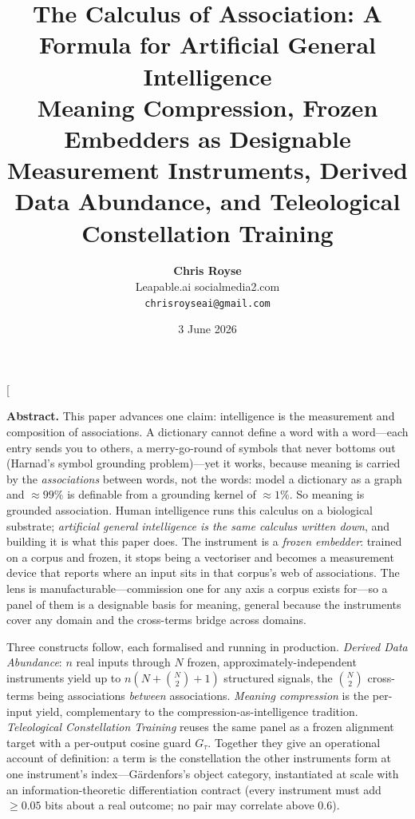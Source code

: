 \documentclass[10pt,twocolumn]{article}
\title{\vspace{-2.2em}\bfseries The Calculus of Association: A Formula for
Artificial General Intelligence\\[0.25em]
\normalsize\mdseries Meaning Compression, Frozen Embedders as Designable
Measurement Instruments, Derived Data Abundance, and Teleological Constellation
Training}
\author{\textbf{Chris Royse}\\[0.2em]
Leapable.ai \textperiodcentered{} socialmedia2.com\\
\texttt{chrisroyseai@gmail.com}}
\date{3 June 2026}
\begin{document}
\twocolumn[
\begin{@twocolumnfalse}
\maketitle
\vspace{-1.0em}
\begin{center}
\begin{minipage}{0.93\textwidth}
\small

\noindent\textbf{Abstract.}
This paper advances one claim: intelligence is the measurement and composition of
associations. A dictionary cannot define a word with a word---each entry sends you
to others, a merry-go-round of symbols that never bottoms out (Harnad's symbol
grounding problem)---yet it works, because meaning is carried by the
\emph{associations} between words, not the words: model a dictionary as a graph and
$\approx 99\%$ is definable from a grounding kernel of $\approx 1\%$. So meaning is
grounded association. Human intelligence runs this calculus on a biological
substrate; \emph{artificial general intelligence is the same calculus written
down}, and building it is what this paper does. The instrument is a \emph{frozen
embedder}: trained on a corpus and frozen, it stops being a vectoriser and becomes
a measurement device that reports where an input sits in that corpus's web of
associations. The lens is manufacturable---commission one for any axis a corpus
exists for---so a panel of them is a designable basis for meaning, general because
the instruments cover any domain and the cross-terms bridge across domains.

Three constructs follow, each formalised and running in production. \emph{Derived
Data Abundance}: $n$ real inputs through $N$ frozen, approximately-independent
instruments yield up to $n(N+\binom{N}{2}+1)$ structured signals, the
$\binom{N}{2}$ cross-terms being associations \emph{between} associations.
\emph{Meaning compression} is the per-input yield, complementary to the
compression-as-intelligence tradition. \emph{Teleological Constellation Training}
reuses the same panel as a frozen alignment target with a per-output cosine guard
$G_\tau$. Together they give an operational account of definition: a term is the
constellation the other instruments form at one instrument's index---G\"ardenfors's
object category, instantiated at scale with an information-theoretic
differentiation contract (every instrument must add ${\ge}0.05$ bits about a real
outcome; no pair may correlate above $0.6$).


\end{minipage}
\end{center}
\end{@twocolumnfalse}
\end{document}

